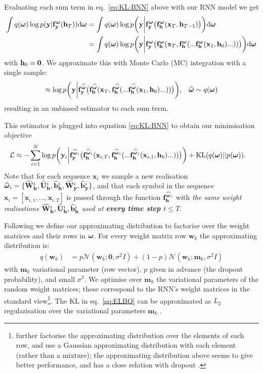 \documentclass{article}
\newcommand{\N}{\mathcal{N}}
\newcommand{\cL}{\mathcal{L}}
\newcommand{\td}{\text{d}}
\newcommand{\f}{\mathbf{f}}
\newcommand{\x}{\mathbf{x}}
\newcommand{\Bb}{\mathbf{b}}
\newcommand{\y}{\mathbf{y}}
\newcommand{\w}{\mathbf{w}}
\newcommand{\W}{\mathbf{W}}
\newcommand{\m}{\mathbf{m}}
\newcommand{\bo}{\text{\boldmath$\omega$}}
\newcommand{\KL}{\text{KL}}
\theoremstyle{definition}
\begin{document}
Evaluating each sum term in eq.\ \eqref{eq:KL:BNN} above with our RNN model we get
\begin{align*}
\int q(\bo) \log p(\y | \f^\bo_\y(\h_T) ) \td \bo
&= \int q(\bo) \log p\bigg(\y \bigg| 
\f^\bo_\y \big(
  \f^\bo_\h(\x_T, \h_{T-1})
\big)
\bigg) \td \bo \\
&= \int q(\bo) \log p\bigg(\y \bigg| 
\f^\bo_\y \big(
  \f^\bo_\h(\x_T, \f^\bo_\h(... \f^\bo_\h(\x_1, \h_0) ...))
\big)
\bigg) \td \bo
\end{align*}
with $\mathbf{h}_0 = \textbf{0}$. We approximate this with Monte Carlo (MC) integration with a single sample:
\newcommand{\boh}{{\widehat{\bo}}}
\begin{align*}
\approx 
\log p\bigg(\y \bigg| 
\f^\boh_\y \big(
  \f^\boh_\h(\x_T, \f^\boh_\h(... \f^\boh_\h(\x_1, \h_0) ...))
\big)
\bigg), && \widehat{\bo} \sim q(\bo)
\end{align*}
resulting in an unbiased estimator to each sum term.

This estimator is plugged into equation \eqref{eq:KL:BNN} to obtain our minimisation objective
\begin{align}
\cL 
&\approx
-\sum_{i=1}^N 
\log p\bigg(\y_i \bigg| 
\f^{\boh_i}_\y \big(
  \f^{\boh_i}_\h(\x_{i,T}, \f^{\boh_i}_\h(... \f^{\boh_i}_\h(\x_{i,1}, \h_0) ...))
\big)
\bigg) + \KL(q(\bo) || p(\bo)). \label{eq:ELBO}
\end{align}
Note that for each sequence $\x_i$ we sample a new realisation $\boh_i = \{\widehat{\W}_\h^i, \widehat{\U}_\h^i, \widehat{\Bb}_\h^i, \widehat{\W}_\y^i, \widehat{\Bb}_\y^i\}$, and that each symbol in the sequence $\x_i = [\x_{i,1}, ..., \x_{i,T}]$ is passed through the function $\f^{\boh_i}_\h$ with \textit{the same weight realisations $\widehat{\W}_\h^i, \widehat{\U}_\h^i, \widehat{\Bb}_\h^i$ used at \textbf{every time step $t \leq T$}}.

Following \citep{Gal2015DropoutB} we define our approximating distribution to factorise over the weight matrices and their rows in $\bo$. For every weight matrix row $\w_k$ the approximating distribution is:
\begin{align*}
q(\w_k) &= p \N(\w_k; \textbf{0}, \sigma^2 I) + (1-p) \N(\w_k; \m_k, \sigma^2 I)
\end{align*}
with $\m_k$ variational parameter (row vector), $p$ given in advance (the dropout probability), and small $\sigma^2$. We optimise over $\m_k$ the variational parameters of the random weight matrices; these correspond to the RNN's weight matrices in the standard view\footnote{\citet{graves2013speech} further factorise the approximating distribution over the elements of each row, and use a Gaussian approximating distribution with each element (rather than a mixture); the approximating distribution above seems to give better performance, and has a close relation with dropout \citep{Gal2015DropoutB}.}. The KL in eq.\ \eqref{eq:ELBO} can be approximated as 
$L_2$ regularisation over the variational parameters $\m_k$
\citep{Gal2015DropoutB}. 
\end{document}
